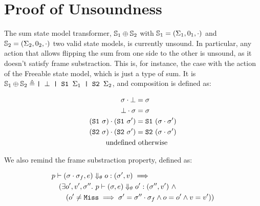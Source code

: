 \section{Proof of Unsoundness}

\newcommand{\sone}[0]{\code{S1}~}
\newcommand{\stwo}[0]{\code{S2}~}

The sum state model transformer, $\mathbb S_1 \oplus \mathbb S_2$ with $\mathbb S_1 = (\Sigma_1, 0_1, \cdot)$ and $\mathbb S_2 = (\Sigma_2, 0_2, \cdot)$ two valid state models, is currently unsound. In particular, any action that allows flipping the sum from one side to the other is unsound, as it doesn't satisfy frame substraction. This is, for instance, the case with the  action of the Freeable state model, which is just a type of sum. It is $\mathbb S_1 \oplus \mathbb S_2 \triangleq \texttt{| }\bot \texttt{ | S1 } \Sigma_1 \texttt{ | S2 } \Sigma_2$, and composition is defined as:

\begin{align*}
	\st \cdot \bot &= \st\\
	\bot \cdot \st &= \st\\
	(\sone\st) \cdot (\sone\st') &= \sone(\st\cdot\st')\\
	(\stwo\st) \cdot (\stwo\st') &= \stwo(\st\cdot\st')\\
	\text{undefined}&\text{ otherwise}
\end{align*}

We also remind the frame substraction property, defined as:

\begin{align*}
	&p\vdash(\sigma\cdot\sigma_f,e)\Downarrow_\theta o:(\sigma',v)\implies\\
	&\quad(\exists o',v',\sigma''.~p\vdash(\sigma,e)\Downarrow_\theta o':(\sigma'',v')~\land\\
	&\qquad(o'\neq \texttt{Miss} \implies \sigma'=\sigma''\cdot\sigma_f\land o=o'\land v=v'))
\end{align*}

\newcommand{\swap}[0]{\code{swap}}
\newcommand{\execswap}[3]{\ppexec{\swap}{#1}{#2,#3}}

